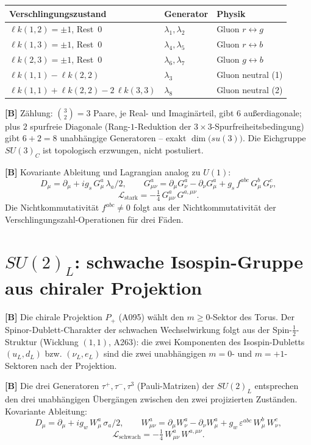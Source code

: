 \begin{center}
\renewcommand{\arraystretch}{1.3}
{\small\begin{tabular}{lll}
\toprule
Verschlingungszustand & Generator & Physik \\
\midrule
$\ell k(1,2)=\pm1$, Rest~0 & $\lambda_1,\lambda_2$ & Gluon $r\leftrightarrow g$ \\
$\ell k(1,3)=\pm1$, Rest~0 & $\lambda_4,\lambda_5$ & Gluon $r\leftrightarrow b$ \\
$\ell k(2,3)=\pm1$, Rest~0 & $\lambda_6,\lambda_7$ & Gluon $g\leftrightarrow b$ \\
$\ell k(1,1)-\ell k(2,2)$  & $\lambda_3$           & Gluon neutral (1) \\
$\ell k(1,1)+\ell k(2,2)-2\,\ell k(3,3)$ & $\lambda_8$ & Gluon neutral (2) \\
\bottomrule
\end{tabular}}
\renewcommand{\arraystretch}{1.0}
\end{center}

\textbf{[B]} Zählung: $\binom{3}{2}=3$ Paare, je Real- und Imaginärteil,
gibt $6$ außerdiagonale; plus $2$ spurfreie Diagonale (Rang-$1$-Reduktion
der $3\times3$-Spurfreiheitsbedingung) gibt $6+2=8$ unabhängige Generatoren
-- exakt $\dim\bigl(su(3)\bigr)$. Die Eichgruppe $SU(3)_C$ ist topologisch
erzwungen, nicht postuliert.

\textbf{[B]} Kovariante Ableitung und Lagrangian analog zu $U(1)$:
\[
  D_\mu = \partial_\mu + ig_s\,G_\mu^a\,\lambda_a/2,
  \qquad
  G_{\mu\nu}^a = \partial_\mu G_\nu^a - \partial_\nu G_\mu^a
    + g_s\,f^{abc}\,G_\mu^b\,G_\nu^c,
\]
\[
  \mathcal{L}_\text{stark} = -\tfrac14\,G_{\mu\nu}^a\,G^{a,\mu\nu}.
\]
Die Nichtkommutativität $f^{abc}\neq0$ folgt aus der Nichtkommutativität der
Verschlingungszahl-Operationen für drei Fäden.

\section{$SU(2)_L$: schwache Isospin-Gruppe aus chiraler Projektion}

\textbf{[B]} Die chirale Projektion $P_+$ (A095) wählt den $m\ge0$-Sektor
des Torus. Der Spinor-Dublett-Charakter der schwachen Wechselwirkung folgt
aus der Spin-$\tfrac12$-Struktur (Wicklung $(1,1)$, A263): die zwei
Komponenten des Isospin-Dubletts $(u_L, d_L)$ bzw. $(\nu_L, e_L)$ sind die
zwei unabhängigen $m=0$- und $m=+1$-Sektoren nach der Projektion.

\textbf{[B]} Die drei Generatoren $\tau^+, \tau^-, \tau^3$ (Pauli-Matrizen)
der $SU(2)_L$ entsprechen den drei unabhängigen Übergängen zwischen den
zwei projizierten Zuständen. Kovariante Ableitung:
\[
  D_\mu = \partial_\mu + ig_w\,W_\mu^a\,\sigma_a/2,
  \qquad
  W_{\mu\nu}^a = \partial_\mu W_\nu^a - \partial_\nu W_\mu^a
    + g_w\,\varepsilon^{abc}\,W_\mu^b\,W_\nu^c,
\]
\[
  \mathcal{L}_\text{schwach} = -\tfrac14\,W_{\mu\nu}^a\,W^{a,\mu\nu}.
\]

